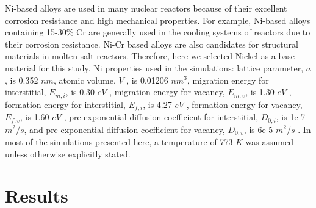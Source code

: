 \documentclass[utf8]{frontiersSCNS} %
\begin{document}
    Ni-based alloys are used in many nuclear reactors because of their excellent corrosion resistance and high mechanical properties. For example, Ni-based alloys containing 15-30\% Cr are generally used in the cooling systems of reactors due to their corrosion resistance. Ni-Cr based alloys are also candidates for structural materials in molten-salt reactors. Therefore, here we selected Nickel as a base material for this study. Ni properties used in the simulations: lattice parameter, $a$, is 0.352 $nm$, atomic volume, $V$ , is 0.01206 $nm^3$, migration energy for interstitial, $E_{m,i}$, is 0.30 $eV$ , migration energy for vacancy, $E_{m,v}$, is 1.30 $eV$ , formation energy for interstitial, $E_{f,i}$, is 4.27 $eV$ , formation energy for vacancy, $E_{f,v}$, is 1.60 $eV$ , pre-exponential diffusion coefficient for interstitial, $D_{0,i}$, is 1e-7 $m^2/s$, and pre-exponential diffusion coefficient for vacancy, $D_{0,v}$, is 6e-5 $m^2/s$ \citep{walgraef1996,zhao2016}. In most of the simulations presented here, a temperature of 773 $K$ was assumed unless otherwise explicitly stated.
    

\section{Results}
   
\end{document}
